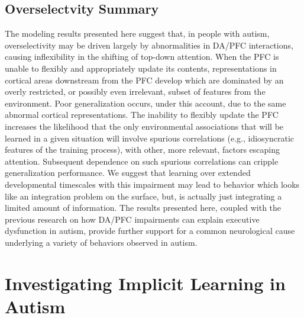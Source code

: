 \documentclass[man]{apa}
\begin{document}
\subsection{Overselectvity Summary}
The modeling results presented here suggest that, in people with autism, overselectivity may be driven largely by abnormalities in DA/PFC interactions, causing inflexibility in the shifting of top-down attention.  When the PFC is unable to flexibly and appropriately update its contents, representations in cortical areas downstream from the PFC develop which are dominated by an overly restricted, or possibly even irrelevant, subset of features from the environment.  Poor generalization occurs, under this account, due to the same abnormal cortical representations.  The inability to flexibly update the PFC increases the likelihood that the only environmental associations that will be learned in a given situation will involve spurious correlations (e.g., idiosyncratic features of the training process), with other, more relevant, factors escaping attention.  Subsequent dependence on such spurious correlations can cripple generalization performance.  We suggest that learning over extended developmental timescales with this impairment may lead to behavior which looks like an integration problem on the surface, but, is actually just integrating a limited amount of information.  The results presented here, coupled with the previous research on how DA/PFC impairments can explain executive dysfunction in autism, provide further support for a common neurological cause underlying a variety of behaviors observed in autism.   

\section{Investigating Implicit Learning in Autism}
\end{document}
